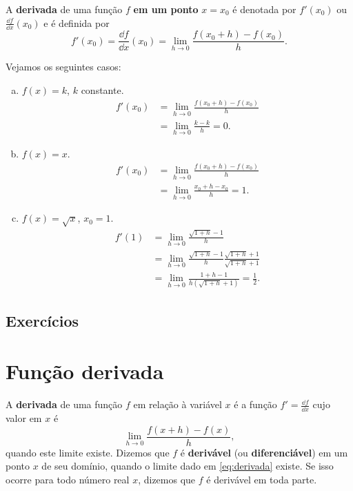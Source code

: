 A {\bf derivada} de uma função $f$ {\bf em um ponto} $x=x_0$ é denotada por $f'(x_0)$ ou $\displaystyle \frac{\dd f}{\dd x}(x_0)$ e é definida por
\begin{equation}
  f'(x_0) = \frac{\dd f}{\dd x}(x_0) = \lim_{h\to 0} \frac{f(x_0+h)-f(x_0)}{h}.
\end{equation}

\begin{ex}
  Vejamos os seguintes casos:
  \begin{enumerate}[a)]
  \item $f(x) = k$, $k$ constante.
    \begin{align}
      f'(x_0) &= \lim_{h\to 0} \frac{f(x_0+h)-f(x_0)}{h}\\
              &= \lim_{h\to 0} \frac{k-k}{h} = 0.
    \end{align}
  \item $f(x) = x$.
    \begin{align}
      f'(x_0) &= \lim_{h\to 0} \frac{f(x_0+h)-f(x_0)}{h} \\
              &= \lim_{h\to 0} \frac{x_0+h-x_0}{h} = 1.
    \end{align}
  \item $f(x) = \sqrt{x}$, $x_0=1$.
    \begin{align}
      f'(1) &= \lim_{h\to 0} \frac{\sqrt{1+h}-1}{h}\\
            &= \lim_{h\to 0} \frac{\sqrt{1+h}-1}{h}\frac{\sqrt{1+h}+1}{\sqrt{1+h}+1}\\
            &= \lim_{h\to 0} \frac{1+h-1}{h(\sqrt{1+h}+1)} = \frac{1}{2}.
    \end{align}
  \end{enumerate}
\end{ex}

\subsection*{Exercícios}

\emconstrucao

\section{Função derivada}\label{cap_deriv_sec_deriv}

A {\bf derivada} de uma função $f$ em relação à variável $x$ é a função $\displaystyle f' = \frac{\dd f}{\dd x}$ cujo valor em $x$ é
\begin{equation}\label{eq:derivada}
  \lim_{h\to 0} \frac{f(x+h)-f(x)}{h},
\end{equation}
quando este limite existe. Dizemos que $f$ é {\bf derivável} (ou {\bf diferenciável}) em um ponto $x$ de seu domínio, quando o limite dado em \eqref{eq:derivada} existe. Se isso ocorre para todo número real $x$, dizemos que $f$ é derivável em toda parte.

